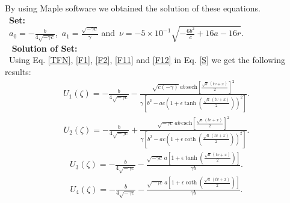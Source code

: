 \documentclass{article}
\numberwithin{equation}{section}
\begin{document}
By using Maple software we obtained the solution of these equations.\\\
\textbf{Set:}\\\
$a_{0} = -\frac{b}{4 \sqrt{-\gamma  c}}$, \,$a_{1} = \frac{\sqrt{-\gamma  c}}{\gamma}$ and  \,$\nu = - 5\times 10^{-1} \sqrt{-\frac{6 b^{2}}{c}+16 a -16 r}$.\\\
\textbf{ Solution of Set:}\\\
Using Eq. \ref{TFN}, \ref{F1}, \ref{F2}, \ref{F11} and \ref{F12} in Eq. \ref{S} we get the following results:
\begin{eqnarray}\label{U1}
U_{1}\left(\zeta \right) =-\frac{b}{4 \sqrt{-\gamma  c}}-\frac{\sqrt{c (-\gamma)}\, a b\, \mathrm{sech} \left[\frac{\sqrt{a}\, \left(t v +x \right)}{2}\right]^{2}}{\gamma  \left[b^{2}-a c \left(1+\epsilon  \tanh  \left(\frac{\sqrt{a}\, \left(t v +x \right)}{2}\right)\right)^{2}\right]}.
\end{eqnarray}
\begin{eqnarray}\label{U2}
U_{2}\left(\zeta \right) =-\frac{b}{4 \sqrt{-\gamma  c}}+\frac{\sqrt{-\gamma  c}\, a b\, \mathrm{csch} \left[\frac{\sqrt{a}\, \left(t v +x \right)}{2}\right]^{2}}{\gamma  \left[b^{2}-a c \left(1+\epsilon  \coth  \left(\frac{\sqrt{a}\, \left(t v +x \right)}{2}\right)\right)^{2}\right]}.
\end{eqnarray}
\begin{eqnarray}\label{U3}
U_{3}\left(\zeta \right) =-\frac{b}{4 \sqrt{-\gamma  c}}-\frac{\sqrt{-\gamma  c}\, a \left[1+\epsilon  \tanh  \left(\frac{\sqrt{a}\, \left(t v +x \right)}{2}\right)\right]}{\gamma  b}.
\end{eqnarray}
\begin{eqnarray}\label{U4}
U_{4}\left(\zeta \right) =
-\frac{b}{4 \sqrt{-\gamma  c}}-\frac{\sqrt{-\gamma  c}\, a \left[1+\epsilon  \coth \left(\frac{\sqrt{a}\, \left(t v +x \right)}{2}\right)\right]}{\gamma  b}.
\end{eqnarray}
\newpage
\end{document}
